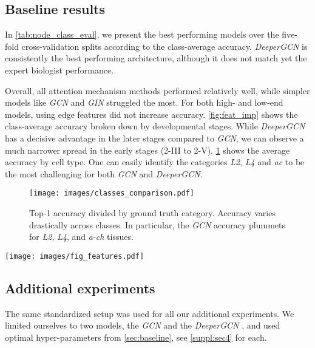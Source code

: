 \documentclass[10pt,twocolumn,letterpaper]{article}
\begin{document}
\subsection{Baseline results}
\label{subsec:res}
In \cref{tab:node_class_eval}, we present the best performing models over the five-fold cross-validation splits according to the class-average accuracy. \textit{DeeperGCN} is consistently the best performing architecture, although it does not match yet the expert biologist performance.

Overall, all attention mechanism methods performed relatively well, while simpler models like \textit{GCN} and \textit{GIN} struggled the most.
For both high- and low-end models, using edge features did not increase accuracy.
\cref{fig:feat_imp} shows the class-average accuracy broken down by developmental stages. While \textit{DeeperGCN} has a decisive advantage in the later stages compared to \textit{GCN}, we can observe a much narrower spread in the early stages (2-III to 2-V).
\cref{fig:classes_accuracy} shows the average accuracy by cell type. One can easily identify the categories \textit{L2}, \textit{L4} and \textit{ac} to be the most challenging for both \textit{GCN} and \textit{DeeperGCN}.

\begin{figure}
    \centering
    \texttt{[image: images/classes\_comparison.pdf]}
  \caption{Top-1 accuracy divided by ground truth category. Accuracy varies drastically across classes. In particular, the \textit{GCN} accuracy plummets for \textit{L2}, \textit{L4}, and \textit{a-ch} tissues.}
  \label{fig:classes_accuracy}
\end{figure}

\begin{figure*}[t!]
  \centering
   \texttt{[image: images/fig\_features.pdf]}
    \caption{Comparison of the class average accuracy for four different feature sets. As one would expect, using all features consistently achieves the highest accuracy. Interestingly, one can observe that the covariant features mostly contribute to accuracy in the early stages (2-III to 2-V). In the later stages (3-I to 3-VI), the invariant features are the major contributors to the overall accuracy. Lastly, even when using only the local degree profile of a node as its feature, the networks are still able to make better than random predictions on the task.}
  \label{fig:feat_imp}
\end{figure*}

\subsection{Additional experiments}
\label{additiona_exp}
The same standardized setup was used for all our additional experiments. We limited ourselves to two models, the \textit{GCN} \cite{kipf2016semi} and the \textit{DeeperGCN} \cite{li2020deepergcn}, and used optimal hyper-parameters from \cref{sec:baseline}, see \cref{suppl:sec4} for each.
\end{document}
